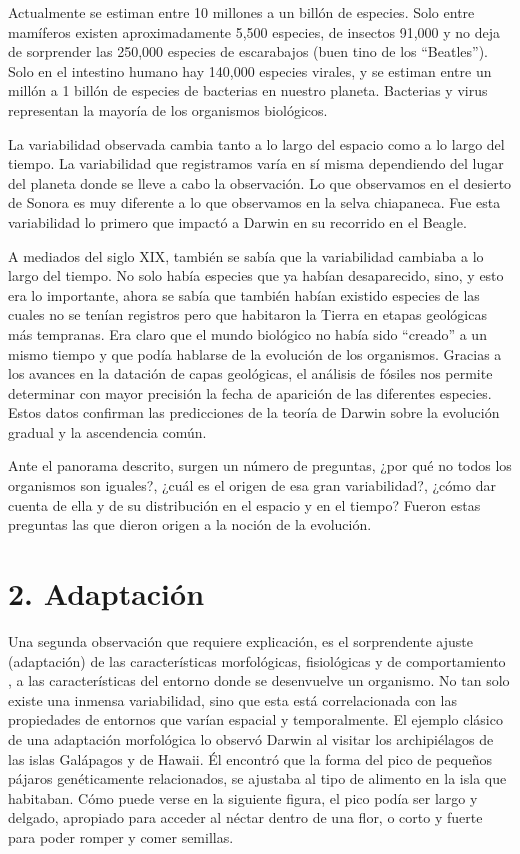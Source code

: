 \documentclass[
  letterpaper,
]{book}
\begin{document}
Actualmente se estiman entre 10 millones a un billón de especies. Solo
entre mamíferos existen aproximadamente 5,500 especies, de insectos
91,000 y no deja de sorprender las 250,000 especies de escarabajos (buen
tino de los ``Beatles''). Solo en el intestino humano hay 140,000
especies virales, y se estiman entre un millón a 1 billón de especies de
bacterias en nuestro planeta. Bacterias y virus representan la mayoría
de los organismos biológicos.

La variabilidad observada cambia tanto a lo largo del espacio como a lo
largo del tiempo. La variabilidad que registramos varía en sí misma
dependiendo del lugar del planeta donde se lleve a cabo la observación.
Lo que observamos en el desierto de Sonora es muy diferente a lo que
observamos en la selva chiapaneca. Fue esta variabilidad lo primero que
impactó a Darwin en su recorrido en el Beagle.

A mediados del siglo XIX, también se sabía que la variabilidad cambiaba
a lo largo del tiempo. No solo había especies que ya habían
desaparecido, sino, y esto era lo importante, ahora se sabía que también
habían existido especies de las cuales no se tenían registros pero que
habitaron la Tierra en etapas geológicas más tempranas. Era claro que el
mundo biológico no había sido ``creado'' a un mismo tiempo y que podía
hablarse de la evolución de los organismos. Gracias a los avances en la
datación de capas geológicas, el análisis de fósiles nos permite
determinar con mayor precisión la fecha de aparición de las diferentes
especies. Estos datos confirman las predicciones de la teoría de Darwin
sobre la evolución gradual y la ascendencia común.

Ante el panorama descrito, surgen un número de preguntas, ¿por qué no
todos los organismos son iguales?, ¿cuál es el origen de esa gran
variabilidad?, ¿cómo dar cuenta de ella y de su distribución en el
espacio y en el tiempo? Fueron estas preguntas las que dieron origen a
la noción de la evolución.

\section{2. Adaptación}\label{adaptaciuxf3n}

Una segunda observación que requiere explicación, es el sorprendente
ajuste (adaptación) de las características morfológicas, fisiológicas y
de comportamiento , a las características del entorno donde se
desenvuelve un organismo. No tan solo existe una inmensa variabilidad,
sino que esta está correlacionada con las propiedades de entornos que
varían espacial y temporalmente. El ejemplo clásico de una adaptación
morfológica lo observó Darwin al visitar los archipiélagos de las islas
Galápagos y de Hawaii. Él encontró que la forma del pico de pequeños
pájaros genéticamente relacionados, se ajustaba al tipo de alimento en
la isla que habitaban. Cómo puede verse en la siguiente figura, el pico
podía ser largo y delgado, apropiado para acceder al néctar dentro de
una flor, o corto y fuerte para poder romper y comer semillas.
\end{document}
